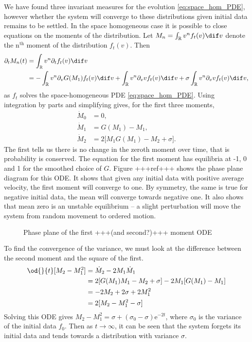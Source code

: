 \documentclass[11pt, a4pape draft]{article}
\renewcommand{\R}{\mathbb{R}}
\begin{document}
        We have found three invariant measures for the evolution \eqref{eq:space_hom_PDE}, however whether the system will converge to these distributions given initial data remains to be settled. In the space homogeneous case it is possible to close equations on the moments of the distribution. Let $M_n = \int_\R v^n f_t(v) \dif v$ denote the n$^\text{th}$ moment of the distribution $f_t(v)$. Then
        \begin{align*}
            \partial_t M_n(t) &= \int_{\R}v^n \partial_t  f_t(v) \dif v\\
            &= - \int_{\R}v^n \partial_v G(M_1)f_t(v) \dif v + \int_{\R}v^n \partial_v vf_t(v) \dif v + \sigma \int_{\R}v^n \partial_vv f_t(v) \dif v,
        \end{align*}
        as $f_t$ solves the space-homogeneous PDE \eqref{eq:space_hom_PDE}. Using integration by parts and simplifying gives, for the first three moments,
        \begin{align*}
            \dot{M}_0 &= 0,\\
            \dot{M}_1 &= G(M_1) - M_1,\\
            \dot{M}_2 &= 2\lbrack M_1G(M_1) - M_2 + \sigma\rbrack.
        \end{align*}
        The first tells us there is no change in the zeroth moment over time, that is probability is conserved. The equation for the first moment has equilibria at -1, 0 and 1 for the smoothed choice of $G$. Figure +++ref+++ shows the phase plane diagram for this ODE. It shows that given any initial data with positive average velocity, the first moment will converge to one. By symmetry, the same is true for negative initial data, the mean will converge towards negative one. It also shows that mean zero is an unstable equilibrium -- a slight perturbation will move the system from random movement to ordered motion.
        \begin{figure}
            \centering
            \caption{Phase plane of the first  +++(and second?)+++ moment ODE}
            \label{fig:M1_phase}
        \end{figure}
        To find the convergence of the variance, we must look at the difference between the second moment and the square of the first.
        \begin{align*}
            \od{}{t}\lbrack M_2 - M_1^2\rbrack &= \dot{M}_2 - 2M_1\dot{M}_1\\
            &= 2\lbrack G(M_1)M_1 - M_2 +\sigma\rbrack - 2M_1\lbrack G(M_1) - M_1\rbrack\\
            &= -2M_2 +2\sigma + 2M_1^2\\
            &= 2\lbrack M_2 - M_1^2 -\sigma\rbrack             
        \end{align*}
        Solving this ODE gives $M_2-M_1^2 = \sigma +(\sigma_0-\sigma)\mathrm{e}^{-2t}$, where $\sigma_0$ is the variance of the initial data $f_0$. Then as $t \to \infty$, it can be seen that the system forgets its initial data and tends towards a distribution with variance $\sigma$.
        
\end{document}

